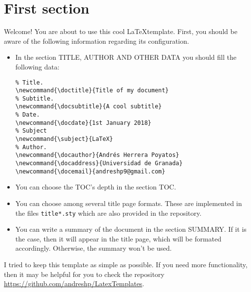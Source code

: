 \documentclass{article}
\makeatletter
\newcommand{\doctitle}{Title of my document}
\newcommand{\docsubtitle}{A cool subtitle}
\newcommand{\docdate}{1st January 2018}
\newcommand{\subject}{LaTeX}
\newcommand{\docauthor}{Andr\'es Herrera Poyatos}
\newcommand{\docaddress}{Universidad de Granada}
\newcommand{\docemail}{andreshp9@gmail.com}
\makeatother
\begin{document}
\maketitle



\newpage
\tableofcontents
\newpage


\section{First section}

Welcome! You are about to use this cool \LaTeX template. First, you should be aware of the following information regarding its configuration.

  \begin{itemize}
  \item In the section TITLE, AUTHOR AND OTHER DATA you should fill the following data:
\begin{verbatim}
% Title.
\newcommand{\doctitle}{Title of my document}
% Subtitle.
\newcommand{\docsubtitle}{A cool subtitle}
% Date.
\newcommand{\docdate}{1st January 2018}
% Subject
\newcommand{\subject}{LaTeX}
% Author.
\newcommand{\docauthor}{Andrés Herrera Poyatos}
\newcommand{\docaddress}{Universidad de Granada}
\newcommand{\docemail}{andreshp9@gmail.com}
\end{verbatim}
    \item You can choose the TOC's depth in the section TOC.
    \item You can choose among several title page formats. These are implemented in the files \texttt{title*.sty} which are also provided in the repository.
    \item You can write a summary of the document in the section SUMMARY. If it is the case, then it will appear in the title page, which will be formated accordingly. Otherwise, the summary won't be used.
  \end{itemize}

I tried to keep this template as simple as possible. If you need more functionality, then it may be helpful for you to check the repository   \url{https://github.com/andreshp/LatexTemplates}.
\end{document}
